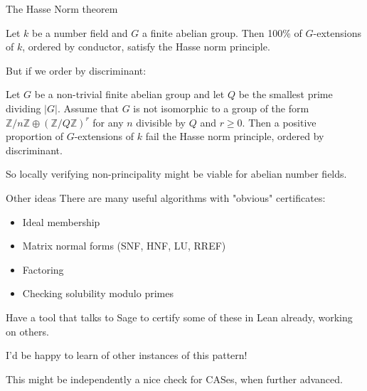 \begin{frame}{The Hasse Norm theorem}
    \begin{theorem}
        Let $k$ be a number field and $G$ a finite abelian group. Then 100\% of $G$-extensions of $k$, ordered by conductor, satisfy the Hasse norm principle.
    \end{theorem}\pause
    But if we order by discriminant:

    \begin{theorem} Let $G$ be a non-trivial finite abelian group and let $Q$ be the smallest prime dividing $|G|$. Assume that $G$ is not isomorphic to a group of the form $\mathbb{Z} / n \mathbb{Z} \oplus(\mathbb{Z} / Q \mathbb{Z})^{r}$ for any $n$ divisible by $Q$ and $r \geq 0$. Then a positive proportion of $G$-extensions of $k$ fail the Hasse norm principle, ordered by discriminant.
    \end{theorem}
    So locally verifying non-principality might be viable for abelian number fields.
\end{frame}

\begin{frame}{Other ideas}
    There are many useful algorithms with "obvious" certificates:
    \begin{itemize}
        \item Ideal membership
        \item Matrix normal forms (SNF, HNF, LU, RREF)
        \item Factoring
        \item Checking solubility modulo primes
    \end{itemize}
\pause
    Have a tool that talks to Sage to certify some of these in Lean already, working on others.

    I'd be happy to learn of other instances of this pattern!

    This might be independently a nice check for CASes, when further advanced.
\end{frame}


